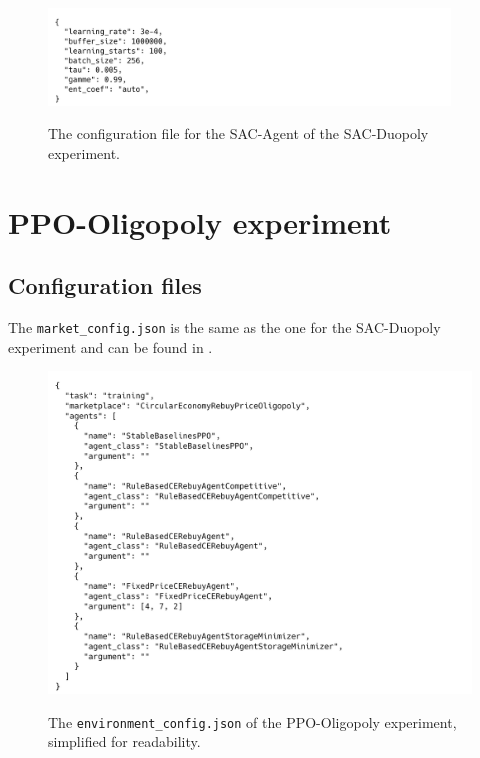 \begin{figure}[ht]
	\includegraphics[width = 0.95\textwidth]{images/configs/SACDuopoly/SACDuopolyAgent.png}\\
	\caption{The configuration file for the SAC-Agent of the SAC-Duopoly experiment.}\label{fig:SACDuopolyConfigAgent}
\end{figure}

\clearpage
\section{PPO-Oligopoly experiment}\label{sec:AppendixOligopoly}

\subsection{Configuration files}\label{sec:AppendixOligopolyConfig}

The \texttt{market\_config.json} is the same as the one for the SAC-Duopoly experiment and can be found in .

\begin{figure}[ht]
	\includegraphics[width = \textwidth]{images/configs/PPOOligopoly/PPOOligopolyEnvironment.png}\\
	\caption{The \texttt{environment\_config.json} of the PPO-Oligopoly experiment, simplified for readability.}\label{fig:PPOOligopolyConfigEnvironment}
\end{figure}

